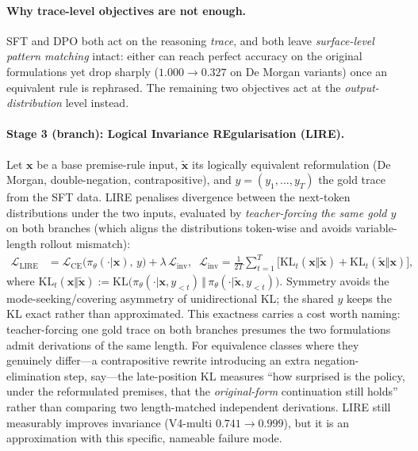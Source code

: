 \documentclass{article}
\begin{document}
\paragraph{Why trace-level objectives are not enough.}
SFT and DPO both act on the reasoning \emph{trace}, and both leave \textit{surface-level pattern matching} intact: either can reach perfect accuracy on the original formulations yet drop sharply ($1.000 \to 0.327$ on De Morgan variants) once an equivalent rule is rephrased. The remaining two objectives act at the \emph{output-distribution} level instead.

\paragraph{Stage 3 (branch): Logical Invariance REgularisation (LIRE).}
Let $\mathbf{x}$ be a base premise-rule input, $\tilde{\mathbf{x}}$ its logically equivalent reformulation (De Morgan, double-negation, contrapositive), and $y=(y_1,\dots,y_T)$ the gold trace from the SFT data. LIRE penalises divergence between the next-token distributions under the two inputs, evaluated by \emph{teacher-forcing the same gold $y$} on both branches (which aligns the distributions token-wise and avoids variable-length rollout mismatch):
\begin{align}
\mathcal{L}_{\mathrm{LIRE}} &= \mathcal{L}_{\mathrm{CE}}\bigl(\pi_\theta(\cdot|\mathbf{x}),\, y\bigr) + \lambda\,\mathcal{L}_{\mathrm{inv}},\;\;
\mathcal{L}_{\mathrm{inv}} = \tfrac{1}{2 T}\!\sum_{t=1}^{T} \bigl[\mathrm{KL}_t(\mathbf{x}\Vert\tilde{\mathbf{x}}) + \mathrm{KL}_t(\tilde{\mathbf{x}}\Vert\mathbf{x})\bigr],
\label{eq:lire}
\end{align}
where $\mathrm{KL}_t(\mathbf{x}\Vert\tilde{\mathbf{x}}) := \mathrm{KL}\bigl(\pi_\theta(\cdot|\mathbf{x},y_{<t})\,\Vert\,\pi_\theta(\cdot|\tilde{\mathbf{x}},y_{<t})\bigr)$. Symmetry avoids the mode-seeking/covering asymmetry of unidirectional KL; the shared $y$ keeps the KL exact rather than approximated. This exactness carries a cost worth naming: teacher-forcing one gold trace on both branches presumes the two formulations admit derivations of the same length. For equivalence classes where they genuinely differ---a contrapositive rewrite introducing an extra negation-elimination step, say---the late-position KL measures ``how surprised is the policy, under the reformulated premises, that the \emph{original-form} continuation still holds'' rather than comparing two length-matched independent derivations. LIRE still measurably improves invariance (V4-multi $0.741\to0.999$), but it is an approximation with this specific, nameable failure mode.
\end{document}
